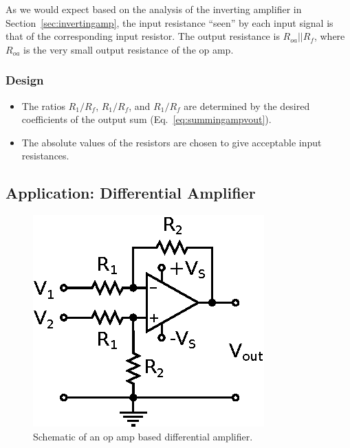 \documentclass[11pt]{article}
\begin{document}
As we would expect based on the analysis of the inverting amplifier in
Section~\ref{sec:invertingamp}, the input resistance ``seen'' by each
input signal is that of the corresponding input resistor.  The output
resistance is $R_{oa}||R_f$, where $R_{oa}$ is the very small output
resistance of the op amp.

\subsubsection*{Design}
\begin{itemize}
\item The ratios $R_1/R_f$, $R_1/R_f$, and $R_1/R_f$ are determined by
  the desired coefficients of the output sum
  (Eq.~\ref{eq:summingampvout}).

\item The absolute values of the resistors are chosen to give 
  acceptable input resistances.

\end{itemize}

\subsection{Application: Differential Amplifier}
\label{sec:differentialamp}

\begin{figure}[h!]
  \begin{center}
    \includegraphics{differenceamp.eps}
    \caption{Schematic of an op amp based differential amplifier.}
    \label{fig:differenceamp}
  \end{center}
\end{figure}
\end{document}
